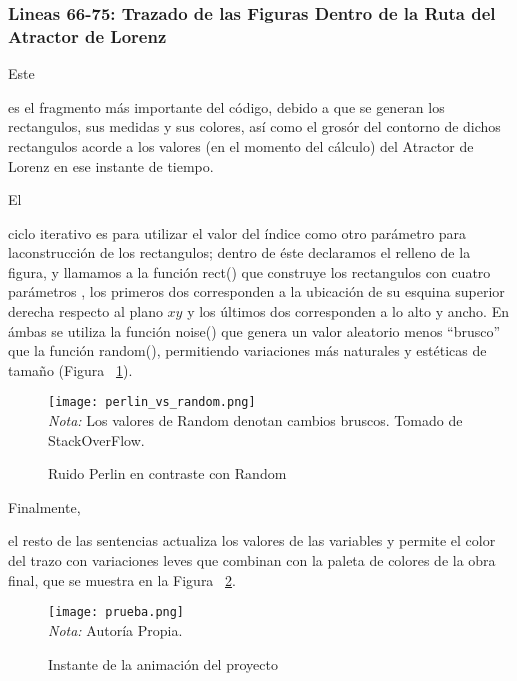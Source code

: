 \documentclass[stu, 12pt, letterpaper, donotrepeattitle, floatsintext]{apa7}
\begin{document}
    \subsubsection*{Lineas 66-75: Trazado de las Figuras Dentro de la Ruta del Atractor de Lorenz}
    Este \begin{justifying}
      es el fragmento más importante del código, debido a que se generan los rectangulos, sus medidas y sus colores,
    así como el grosór del contorno de dichos rectangulos acorde a los valores (en el momento del cálculo) del Atractor
    de Lorenz en ese instante de tiempo.\par
    \end{justifying}
    El \begin{justifying}
      ciclo iterativo es para utilizar el valor del índice como otro parámetro para laconstrucción de los rectangulos; dentro de éste
      declaramos el relleno de la figura, y llamamos a la función {\selectfont rect()} que construye los rectangulos con cuatro parámetros
      , los primeros dos corresponden a la ubicación de su esquina superior derecha respecto al plano \(xy\) y los últimos dos corresponden a lo alto y ancho.
      En ámbas se utiliza la función {\selectfont noise()} que genera un valor aleatorio menos ``brusco'' que la función {\selectfont random()}, 
      permitiendo variaciones más naturales y estéticas de tamaño (Figura ~\ref{fig:ruido}).\par%
    \end{justifying}
    \begin{figure}[H]
      \centering
      \caption{Ruido Perlin en contraste con Random}
      \texttt{[image: perlin\_vs\_random.png]}
      \\\emph{Nota:} Los valores de Random denotan cambios bruscos. Tomado de StackOverFlow.\label{fig:ruido}
    \end{figure}
    Finalmente, \begin{justifying}
      el resto de las sentencias actualiza los valores de las variables y permite el color del trazo con variaciones leves que combinan con la paleta de colores
    de la obra final, que se muestra en la Figura ~\ref{fig:proyecto}.\par %
    \end{justifying}
    \begin{figure}[H]
      \centering
      \caption{Instante de la animación del proyecto}
      \texttt{[image: prueba.png]}
      \\\emph{Nota:} Autoría Propia.\label{fig:proyecto}
    \end{figure}
    \vspace{\baselineskip}
\end{document}
